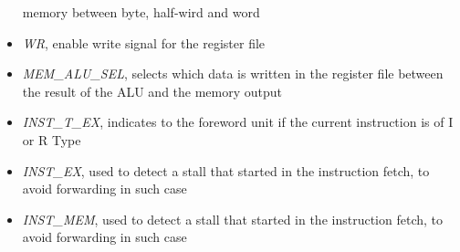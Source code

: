 \begin{itemize}
	      memory between byte, half-wird and word
	\item \textit{WR}, enable write signal for the register file
	\item \textit{MEM\_ALU\_SEL}, selects which data is written in the register
	      file between the result of the ALU and the memory output 
	\item \textit{INST\_T\_EX}, indicates to the foreword unit if the current 
	      instruction is of I or R Type
	\item \textit{INST\_EX}, used to detect a stall that started in the
	      instruction fetch, to avoid forwarding in such case 
	\item \textit{INST\_MEM}, used to detect a stall that started in the
		  instruction fetch, to avoid forwarding in such
		  case 								
\end{itemize}




